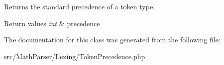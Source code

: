 Returns the standard precedence of a token type. 


\begin{DoxyRetVals}{Return values}
{\em int} & precedence \\
\hline
\end{DoxyRetVals}


The documentation for this class was generated from the following file\-:\begin{DoxyCompactItemize}
\item 
src/\-Math\-Parser/\-Lexing/Token\-Precedence.\-php\end{DoxyCompactItemize}
